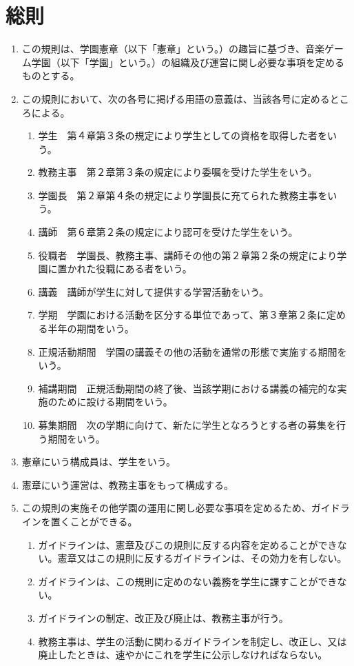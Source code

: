 \newpage
\chapter{総則}
\begin{enumerate}[label=第\arabic*条　]
  \item この規則は、学園憲章（以下「憲章」という。）の趣旨に基づき、音楽ゲーム学園（以下「学園」という。）の組織及び運営に関し必要な事項を定めるものとする。
  \item この規則において、次の各号に掲げる用語の意義は、当該各号に定めるところによる。
      \begin{enumerate}[label=(\arabic*)　]
        \item 学生　第４章第３条の規定により学生としての資格を取得した者をいう。
        \item 教務主事　第２章第３条の規定により委嘱を受けた学生をいう。
        \item 学園長　第２章第４条の規定により学園長に充てられた教務主事をいう。
        \item 講師　第６章第２条の規定により認可を受けた学生をいう。
        \item 役職者　学園長、教務主事、講師その他の第２章第２条の規定により学園に置かれた役職にある者をいう。
        \item 講義　講師が学生に対して提供する学習活動をいう。
        \item 学期　学園における活動を区分する単位であって、第３章第２条に定める半年の期間をいう。
        \item 正規活動期間　学園の講義その他の活動を通常の形態で実施する期間をいう。
        \item 補講期間　正規活動期間の終了後、当該学期における講義の補完的な実施のために設ける期間をいう。
        \item 募集期間　次の学期に向けて、新たに学生となろうとする者の募集を行う期間をいう。
      \end{enumerate}
  \item 憲章にいう構成員は、学生をいう。
  \item 憲章にいう運営は、教務主事をもって構成する。
  \item この規則の実施その他学園の運用に関し必要な事項を定めるため、ガイドラインを置くことができる。
    \begin{enumerate}[label=\arabic*　,start=2,leftmargin=*]
      \item ガイドラインは、憲章及びこの規則に反する内容を定めることができない。憲章又はこの規則に反するガイドラインは、その効力を有しない。
      \item ガイドラインは、この規則に定めのない義務を学生に課すことができない。
      \item ガイドラインの制定、改正及び廃止は、教務主事が行う。
      \item 教務主事は、学生の活動に関わるガイドラインを制定し、改正し、又は廃止したときは、速やかにこれを学生に公示しなければならない。
    \end{enumerate}
\end{enumerate}
